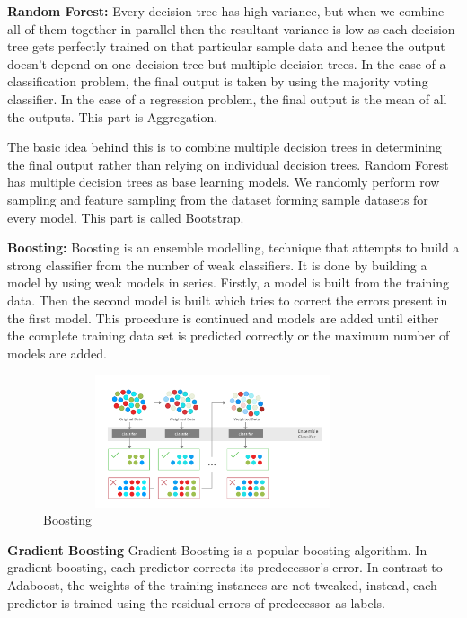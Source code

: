 \documentclass[12pt]{article}
\begin{document}
\textbf{Random Forest:}
Every decision tree has high variance, but when we combine all of them together in parallel then the resultant variance is low as each decision tree gets perfectly trained on that particular sample data and hence the output doesn’t depend on one decision tree but multiple decision trees. In the case of a classification problem, the final output is taken by using the majority voting classifier. In the case of a regression problem, the final output is the mean of all the outputs. This part is Aggregation.
 

The basic idea behind this is to combine multiple decision trees in determining the final output rather than relying on individual decision trees.
Random Forest has multiple decision trees as base learning models. We randomly perform row sampling and feature sampling from the dataset forming sample datasets for every model. This part is called Bootstrap.

\textbf{Boosting:}
Boosting is an ensemble modelling, technique that attempts to build a strong classifier from the number of weak classifiers. It is done by building a model by using weak models in series. Firstly, a model is built from the training data. Then the second model is built which tries to correct the errors present in the first model. This procedure is continued and models are added until either the complete training data set is predicted correctly or the maximum number of models are added.

\begin{figure}[H]
\begin{center}
 \includegraphics[width=10cm, height=3.9cm]{Tech2}
\caption{Boosting}
\end{center}
\end{figure}

\textbf{Gradient Boosting }
Gradient Boosting is a popular boosting algorithm. In gradient boosting, each predictor corrects its predecessor’s error. In contrast to Adaboost, the weights of the training instances are not tweaked, instead, each predictor is trained using the residual errors of predecessor as labels.
\end{document}
